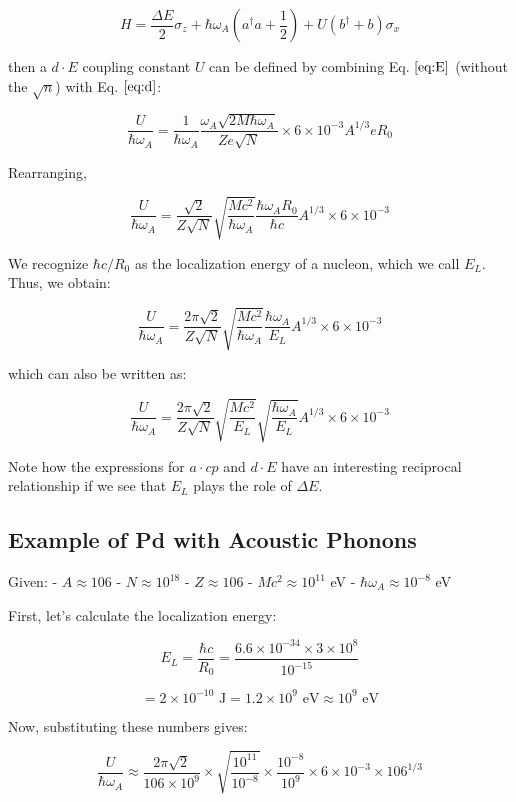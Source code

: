 \documentclass[
]{article}
\renewcommand{\[}{\begin{equation}}
\renewcommand{\]}{\end{equation}}
\begin{document}
\[
H = \frac{\Delta E}{2} \sigma_z + \hbar\omega_A\left(a^{\dagger}a +\frac{1}{2}\right) + U\left( b^{\dagger} + b \right)\sigma_x
\]

then a \(d \cdot E\) coupling constant \(U\) can be defined by combining
Eq. \(\ref{eq:E}\) (without the \(\sqrt{n}\)) with Eq. \(\ref{eq:d}\):

\[
\frac{U}{\hbar \omega_A} = \frac{1}{\hbar \omega_A} \frac{\omega_A \sqrt{2M \hbar \omega_A}}{Ze \sqrt{N}} \times 6 \times 10^{-3} A^{1/3} e R_0
\]

Rearranging,

\[
\frac{U}{\hbar \omega_A} = \frac{\sqrt{2}}{Z \sqrt{N}} \sqrt{\frac{M c^2}{\hbar \omega_A}} \frac{\hbar \omega_A R_0}{\hbar c} A^{1/3} \times 6 \times 10^{-3}
\]

We recognize \(\hbar c / R_0\) as the localization energy of a nucleon,
which we call \(E_L\). Thus, we obtain:

\[
\frac{U}{\hbar \omega_A} = \frac{2\pi\sqrt{2}}{Z \sqrt{N}} \sqrt{\frac{M c^2}{\hbar \omega_A}} \frac{\hbar \omega_A}{E_L} A^{1/3} \times 6 \times 10^{-3}
\]

which can also be written as:

\[
\frac{U}{\hbar \omega_A} = \frac{2\pi\sqrt{2}}{Z \sqrt{N}} \sqrt{\frac{M c^2}{E_L}} \sqrt{\frac{\hbar \omega_A}{E_L}} A^{1/3} \times 6 \times 10^{-3}
\]

Note how the expressions for \(a \cdot cp\) and \(d \cdot E\) have an
interesting reciprocal relationship if we see that \(E_L\) plays the
role of \(\Delta E\).

\subsection{Example of Pd with Acoustic
Phonons}\label{example-of-pd-with-acoustic-phonons}

Given: - \(A \approx 106\) - \(N \approx 10^{18}\) - \(Z \approx 106\) -
\(M c^2 \approx 10^{11}\) eV - \(\hbar \omega_A \approx 10^{-8}\) eV

First, let's calculate the localization energy:

\[
E_L = \frac{\hbar c}{R_0} = \frac{6.6 \times 10^{-34} \times 3 \times 10^8}{10^{-15}}
\]

\[
= 2 \times 10^{-10} \text{ J} = 1.2 \times 10^9 \text{ eV} \approx 10^9 \text{ eV}
\]

Now, substituting these numbers gives:

\[
\frac{U}{\hbar \omega_A} \approx \frac{2 \pi\sqrt{2} }{106 \times 10^9} \times \sqrt{\frac{10^{11}}{10^{-8}}} \times \frac{10^{-8}}{10^9} \times 6 \times 10^{-3} \times 106^{1/3}
\]
\end{document}
